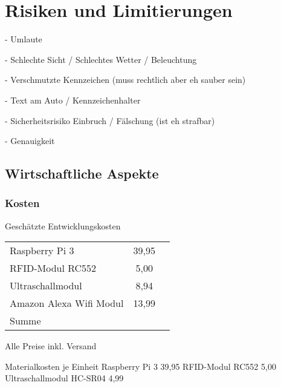 \chapter{Risiken und Limitierungen}

- Umlaute

- Schlechte Sicht / Schlechtes Wetter / Beleuchtung

- Verschmutzte Kennzeichen (muss rechtlich aber eh sauber sein)

- Text am Auto / Kennzeichenhalter

- Sicherheitsrisiko Einbruch  / Fälschung (ist eh strafbar)

- Genauigkeit


\section{Wirtschaftliche Aspekte}

\subsection{Kosten}
Geschätzte Entwicklungskosten \newline

\begin{tabular}[h]{lcr}
Raspberry Pi 3	&   39,95\autocite{Pi3b} \newline \\
RFID-Modul RC552 &		5,00\autocite{RFID} \newline\\
Ultraschallmodul	&  8,94\autocite{SR04} \newline \\
Amazon Alexa Wifi Modul & 13,99\autocite{eWe}	\\
Summe
\end{tabular} \newline

Alle Preise inkl. Versand

Materialkosten je Einheit
Raspberry Pi 3 			   39,95
RFID-Modul RC552			5,00
Ultraschallmodul HC-SR04	4,99





